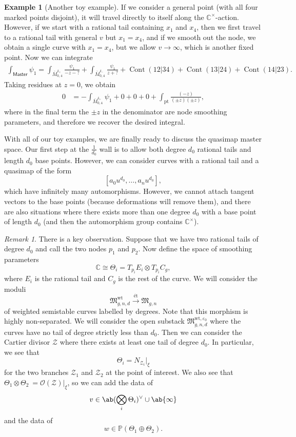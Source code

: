 \documentclass{amsart}
\theoremstyle{definition}
\newtheorem{exm}[thm]{Example}
\theoremstyle{remark}
\newtheorem{rmk}[thm]{Remark}
\theoremstyle{plain}
\theoremstyle{definition}
\theoremstyle{remark}
\newcommand{\C}{\mathbb{C}}
\renewcommand{\P}{\mathbb{P}}
\newcommand{\ep}{\varepsilon}
\newcommand{\mc}[1]{\mathcal{#1}}
\newcommand{\mf}[1]{\mathfrak{#1}}
\newcommand{\mr}[1]{\mathrm{#1}}
\newcommand{\on}[1]{\operatorname{#1}}
\newcommand{\ms}[1]{\mathsf{#1}}
\newcommand{\1}{\mathbf{1}}
\newcommand{\2}{\mathbf{2}}
\newcommand{\3}{\mathbf{3}}
\begin{document}
\begin{exm}[Another toy example]
    If we consider a general point (with all four marked points disjoint), it will travel directly to itself along the \(\C^{\times}\)-action. However, if we start with a rational tail containing \(x_1\) and \(x_4\), then we first travel to a rational tail with general \(v\) but \(x_1 = x_4\), and if we smooth out the node, we obtain a single curve with \(x_1 = x_4\), but we allow \(v \to \infty\), which is another fixed point. Now we can integrate
    \begin{align*}
        \int_{\ms{Master}} \psi_1 = \int_{\bar{M}_{0,4}^{\delta_+}} \frac{\psi_1}{-z-?} + \int_{\bar{M}_{0,4}^{\delta_-}} \frac{\psi_1}{z+?} + \on{Cont}(12|34) + \on{Cont}(13|24) + \on{Cont}(14|23).
    \end{align*}
    Taking residues at \(z = 0\), we obtain
    \begin{align*}
        0 &= - \int_{\bar{M}_{0,4}^{\delta_+}} \psi_1 + 0 + 0 + 0 + \int_{\mr{pt}} \frac{(-z)}{(\pm z)(\pm z)},
    \end{align*}
    where in the final term the \(\pm z\) in the denominator are node smoothing parameters, and therefore we recover the desired integral.
\end{exm}

With all of our toy examples, we are finally ready to discuss the quasimap master space. Our first step at the \(\frac{1}{d_0}\) wall is to allow both degree \(d_0\) rational tails and length \(d_0\) base points. However, we can consider curves with a rational tail and a quasimap of the form
\[ [a_0 u^{d_0}, \ldots, a_n u^{d_0}], \]
which have infinitely many automorphisms. However, we cannot attach tangent vectors to the base points (because deformations will remove them), and there are also situations where there exists more than one degree \(d_0\) with a base point of length \(d_0\) (and then the automorphism group contains \(\C^{\times}\)).

\begin{rmk}
    There is a key observation. Suppose that we have two rational tails of degree \(d_0\) and call the two nodes \(p_1\) and \(p_2\). Now define the space of smoothing parameters
    \[ \C \cong \Theta_i = T_{p_i} E_i \otimes T_{p_i} C_g, \]
    where \(E_i\) is the rational tail and \(C_g\) is the rest of the curve. We will consider the moduli
    \[ \mf{M}_{g,n,d}^{\mr{wt}} \xrightarrow{\text{\'et}} \mf{M}_{g,n} \]
    of weighted semistable curves labelled by degrees. Note that this morphism is highly non-separated. We will consider the open substack \(\mf{M}_{g,n,d}^{\mr{wt}, \ep_0}\) where the curves have no tail of degree strictly less than \(d_0\). Then we can consider the Cartier divisor \(\mc{Z}\) where there exists at least one tail of degree \(d_0\). In particular, we see that
    \[ \Theta_i = N_{\mc{Z}_i} |_{\xi} \]
    for the two branches \(\mc{Z}_1\) and \(\mc{Z}_2\) at the point of interest. We also see that \(\Theta_1 \otimes \Theta_2\ = \mc{O}(\mc{Z})|_{\xi}\), so we can add the data of
    \[ v \in \ab(\bigotimes_i \Theta_i)^{\vee} \cup \ab\{\infty\} \]
    and the data of 
    \[ w \in \P(\Theta_1 \oplus\Theta_2). \]
\end{rmk}
\end{document}

